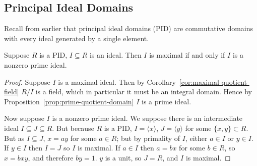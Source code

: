 \subsection*{Principal Ideal Domains}

\begin{remark}
    Recall from earlier that principal ideal domains (PID)
    are commutative domains with every ideal generated by a single element.
\end{remark}
\begin{proposition}\label{prop:pid-maximal-is-prime}
    Suppose \(R\) is a PID, \(I \subseteq R\) is an ideal.
    Then \(I\) is maximal if and only if \(I\) is a nonzero prime ideal.
\end{proposition}
\begin{proof}
    Suppose \(I\) is a maximal ideal.
    Then by Corollary~\ref{cor:maximal-quotient-field} \(R/I\) is a field,
    which in particular it must be an integral domain.
    Hence by Proposition~\ref{prop:prime-quotient-domain} \(I\) is a prime ideal.

    Now suppose \(I\) is a nonzero prime ideal.
    We suppose there is an intermediate ideal \(I \subseteq J \subseteq R\).
    But because \(R\) is a PID,
    \(I = \langle x \rangle\), \(J = \langle y \rangle\)
    for some \(\{x,y\} \subset R\).
    But as \(I \subseteq J\), \(x = ay\) for some \(a \in R\);
    but by primality of \(I\), either \(a \in I\) or \(y \in I\).
    If \(y \in I\) then \(I = J\) so \(I\) is maximal.
    If \(a \in I\) then \(a = bx\) for some \(b \in R\),
    so \(x = bxy\), and therefore \(by = 1\).
    \(y\) is a unit, so \(J = R\), and \(I\) is maximal.
\end{proof}

